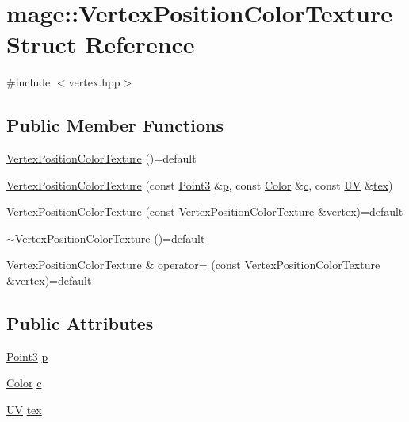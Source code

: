 \hypertarget{structmage_1_1_vertex_position_color_texture}{}\section{mage\+:\+:Vertex\+Position\+Color\+Texture Struct Reference}
\label{structmage_1_1_vertex_position_color_texture}


{\ttfamily \#include $<$vertex.\+hpp$>$}

\subsection*{Public Member Functions}
\begin{DoxyCompactItemize}
\item 
\hyperlink{structmage_1_1_vertex_position_color_texture_a49020fb0c115c3dc3c94471fcbc30a82}{Vertex\+Position\+Color\+Texture} ()=default
\item 
\hyperlink{structmage_1_1_vertex_position_color_texture_a98753386ae479cdc11174136bf8e9412}{Vertex\+Position\+Color\+Texture} (const \hyperlink{structmage_1_1_point3}{Point3} \&\hyperlink{structmage_1_1_vertex_position_color_texture_a145c2e2fce90b07252b778b46e31ea24}{p}, const \hyperlink{structmage_1_1_color}{Color} \&\hyperlink{structmage_1_1_vertex_position_color_texture_afb9ec100ec42e83e501448d4bb0ee4f8}{c}, const \hyperlink{structmage_1_1_u_v}{UV} \&\hyperlink{structmage_1_1_vertex_position_color_texture_adfbaa105e46bb65f502ec33eaa2e8b15}{tex})
\item 
\hyperlink{structmage_1_1_vertex_position_color_texture_a722b0b67f3e8373c1f1935c5cfaa4212}{Vertex\+Position\+Color\+Texture} (const \hyperlink{structmage_1_1_vertex_position_color_texture}{Vertex\+Position\+Color\+Texture} \&vertex)=default
\item 
\hyperlink{structmage_1_1_vertex_position_color_texture_a07cc697a88ef1a75ef64aadac9945c11}{$\sim$\+Vertex\+Position\+Color\+Texture} ()=default
\item 
\hyperlink{structmage_1_1_vertex_position_color_texture}{Vertex\+Position\+Color\+Texture} \& \hyperlink{structmage_1_1_vertex_position_color_texture_a6b8d5ebc779ddf9f6e68dc83cb30fe0c}{operator=} (const \hyperlink{structmage_1_1_vertex_position_color_texture}{Vertex\+Position\+Color\+Texture} \&vertex)=default
\end{DoxyCompactItemize}
\subsection*{Public Attributes}
\begin{DoxyCompactItemize}
\item 
\hyperlink{structmage_1_1_point3}{Point3} \hyperlink{structmage_1_1_vertex_position_color_texture_a145c2e2fce90b07252b778b46e31ea24}{p}
\item 
\hyperlink{structmage_1_1_color}{Color} \hyperlink{structmage_1_1_vertex_position_color_texture_afb9ec100ec42e83e501448d4bb0ee4f8}{c}
\item 
\hyperlink{structmage_1_1_u_v}{UV} \hyperlink{structmage_1_1_vertex_position_color_texture_adfbaa105e46bb65f502ec33eaa2e8b15}{tex}
\end{DoxyCompactItemize}
